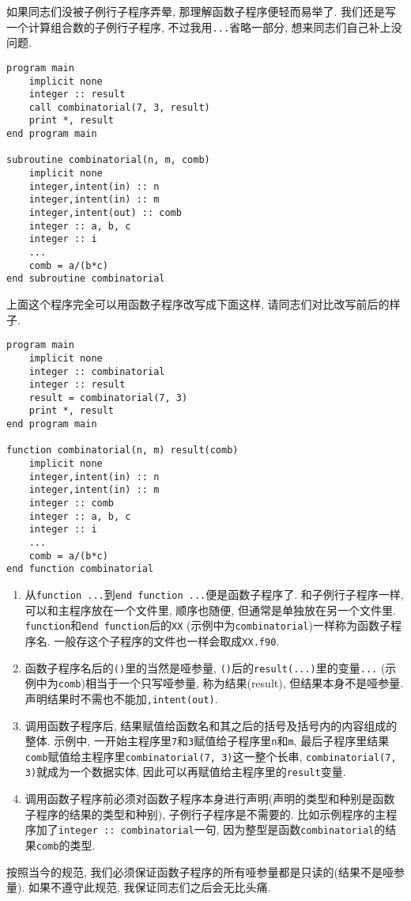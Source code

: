 如果同志们没被子例行子程序弄晕, 那理解函数子程序便轻而易举了. 我们还是写一个计算组合数的子例行子程序, 不过我用\verb|...|省略一部分, 想来同志们自己补上没问题.
\begin{verbatim}
program main
    implicit none
    integer :: result
    call combinatorial(7, 3, result)
    print *, result
end program main

subroutine combinatorial(n, m, comb)
    implicit none
    integer,intent(in) :: n
    integer,intent(in) :: m
    integer,intent(out) :: comb
    integer :: a, b, c
    integer :: i
    ...
    comb = a/(b*c)
end subroutine combinatorial
\end{verbatim}
上面这个程序完全可以用函数子程序改写成下面这样, 请同志们对比改写前后的样子.
\begin{verbatim}
program main
    implicit none
    integer :: combinatorial
    integer :: result
    result = combinatorial(7, 3)
    print *, result
end program main

function combinatorial(n, m) result(comb)
    implicit none
    integer,intent(in) :: n
    integer,intent(in) :: m
    integer :: comb
    integer :: a, b, c
    integer :: i
    ...
    comb = a/(b*c)
end function combinatorial
\end{verbatim}
\begin{enumerate}
    \item 从\verb|function ...|到\verb|end function ...|便是函数子程序了. 和子例行子程序一样, 可以和主程序放在一个文件里, 顺序也随便, 但通常是单独放在另一个文件里. \verb|function|和\verb|end function|后的\verb|XX| (示例中为\verb|combinatorial|)一样称为函数子程序名. 一般存这个子程序的文件也一样会取成\verb|XX.f90|.
    \item 函数子程序名后的\verb|()|里的当然是哑参量, \verb|()|后的\verb|result(...)|里的变量\verb|...| (示例中为\verb|comb|)相当于一个只写哑参量, 称为结果(result), 但结果本身不是哑参量. 声明结果时不需也不能加\verb|,intent(out)|.
    \item 调用函数子程序后, 结果赋值给函数名和其之后的括号及括号内的内容组成的整体. 示例中, 一开始主程序里\verb|7|和\verb|3|赋值给子程序里\verb|n|和\verb|m|, 最后子程序里结果\verb|comb|赋值给主程序里\verb|combinatorial(7, 3)|这一整个长串, \verb|combinatorial(7, 3)|就成为一个数据实体, 因此可以再赋值给主程序里的\verb|result|变量.
    \item 调用函数子程序前必须对函数子程序本身进行声明(声明的类型和种别是函数子程序的结果的类型和种别), 子例行子程序是不需要的. 比如示例程序的主程序加了\verb|integer :: combinatorial|一句, 因为整型是函数\verb|combinatorial|的结果\verb|comb|的类型.
\end{enumerate}
按照当今的规范, 我们必须保证函数子程序的所有哑参量都是只读的(结果不是哑参量). 如果不遵守此规范, 我保证同志们之后会无比头痛.

